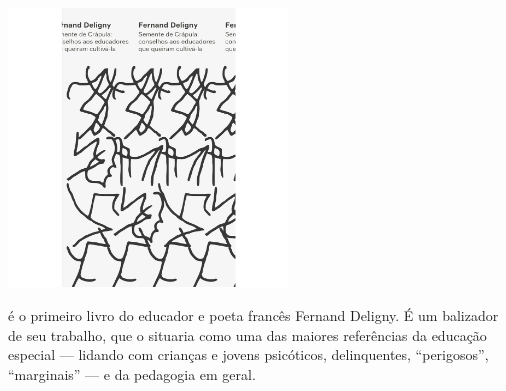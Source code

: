 \vfill

\hspace*{-.4cm}\begin{minipage}[c]{.5\linewidth}
\small{
{}}
\end{minipage}

\pagebreak

\begin{center}
\hspace*{-3.6cm}
\hspace*{3.1cm}\includegraphics[width=74mm]{./grid/deligny.png}
\end{center}

\hspace*{-7cm}\hrulefill\hspace*{-7cm}

\medskip

 é o primeiro livro do educador e poeta francês Fernand Deligny. É um balizador de seu trabalho, que o situaria como uma das maiores referências da educação especial --- lidando com crianças e jovens psicóticos, delinquentes, “perigosos”, “marginais” --- e da pedagogia em geral.

